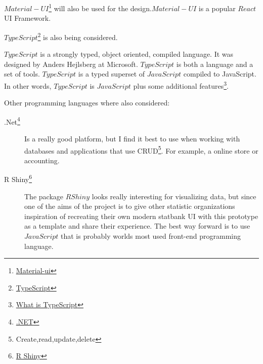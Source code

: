 $Material-UI$\footnote{\href{https://material-ui.com/}{Material-ui}\label{mui}} will also be used for the design.$Material-UI$ is a popular $React$ UI Framework. 

$TypeScript$\footnote{\href{https://www.typescriptlang.org/}{TypeScript}\label{typeScript}} is also being considered.

$TypeScript$ is a strongly typed, object oriented, compiled language. It was designed by Anders Hejlsberg at Microsoft. $TypeScript$ is both a language and a set of tools. $TypeScript$ is a typed superset of $JavaScript$ compiled to JavaScript. In other words, $TypeScript$ is $JavaScript$ plus some additional features\footnote{\href{https://www.tutorialspoint.com/typescript/typescript_overview}{What is TypeScript}\label{whatIsTypeScript?}}.

Other programming languages where also considered:
\begin{description}

\item [.Net\footnote{\href{https://dotnet.microsoft.com/}{.NET}\label{.net}}] Is a really good platform, but I find it best to use when working with databases and applications that use CRUD\footnote{Create,read,update,delete}. For example, a online store or accounting.
\item [R Shiny\footnote{\href{https://www.rstudio.com/products/shiny/}{R Shiny}\label{rShiny}}] The package $R Shiny$ looks really interesting for visualizing data, but since one of the aims of the project is to give other statistic organizations inspiration of recreating their own modern statbank UI with this prototype as a template and share their experience. The best way forward is to use $JavaScript$ that is probably worlds most used front-end programming language. 
\end{description}


